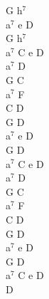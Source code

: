 \documentclass[a5paper, 10pt]{book}
\begin{document}
\begin{minipage}[t]{0.2\textwidth}
  G h$^7$\\
  a$^7$ e D\\
  G h$^7$\\
  a$^7$ C e D\\

  a$^7$ D\\
  G C\\
  a$^7$ F\\
  C  D \\

  G D\\
  a$^7$ e D\\
  G D\\
  a$^7$ C e D\\

  a$^7$ D\\
  G C\\
  a$^7$ F\\
  C  D \\

  G D\\
  a$^7$ e D\\
  G D\\
  a$^7$ C e D\\

  D\\
\end{minipage}

\newpage
\end{document}
